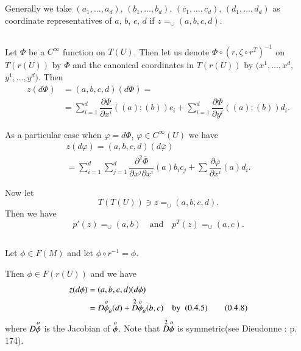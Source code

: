 \setcounter{subsection}{2}
\subsection{}\label{chap0:0.4.3}
Generally we take $(a_{1},\ldots,a_{d})$, $(b_{1},\ldots,b_{d})$,
$(c_{1},\ldots,c_{d})$, $(d_{1},\ldots,d_{d})$ as coordinate
representatives of $a$, $b$, $c$, $d$ if
$z\displaystyle{\mathop{=}_{\cup}}(a,b,c,d)$. 

\subsection{}\label{chap0:0.4.4}
Let $\Phi$ be a $C^{\infty}$ function on $T(U)$. Then let us denote
$\Phi\circ (r,\zeta\circ r^{T})^{-1}$ on $T(r(U))$ by
$\overline{\Phi}$ and the canonical coordinates in $T(r(U))$ by
$(x^{1},\ldots,x^{d}$, $y^{1},\ldots,y^{d})$. Then
\begin{align*}
z(d\Phi) &= (a,b,c,d)(d\Phi)=\tag{0.4.5}\label{chap0:0.4.5}\\
         &= \sum^{d}_{i=1}\dfrac{\partial\Phi}{\partial
  x^{i}}((a);(b))c_{i}+\sum^{d}_{i=1}\dfrac{\partial\Phi}{\partial
  y^{i}}((a);(b))d_{i}. 
\end{align*}

As a particular case when $\varphi=d\Phi$, $\varphi\in C^{\infty}(U)$
we have
\begin{gather*}
z(d\varphi)=(a,b,c,d)(d\overline{\varphi})\\
=\sum^{d}_{i=1}\sum^{d}_{j=1}\dfrac{\partial^{2}\overline{\Phi}}{\partial
  x^{j}\partial x^{i}}(a)b_{i}c_{j}+\sum \dfrac{\partial
  \overline{\varphi}}{\partial x^{i}}(a)d_{i}.
\end{gather*}

Now let
$$
T(T(U))\ni z\mathop{=}_{\cup}(a,b,c,d).
$$
Then we have
\begin{equation*}\label{chap0:0.4.6}
p'(z)\mathop{=}_{\cup}(a,b)\quad\text{and}\quad p^{T}(z)\mathop{=}_{\cup}(a,c).\tag{0.4.6}
\end{equation*}

\setcounter{subsection}{6}
\subsection{}\label{chap0:0.4.7}


\begin{example*}
Let $\phi\in F(M)$ and let $\phi\circ r^{-1}=\phi$.
\end{example*}
Then $\phi\in F(r(U))$ and we have
\begin{align*}
z(d\phi)& =(a,b,c,d)(d\phi)\\
&= D\ophi_{a}(d)+\overset{2}{D}\ophi_{a}(b,c)\quad\text{by \ (0.4.5)}\tag{0.4.8}\label{chap0:0.4.8} 
\end{align*}\pageoriginale
where $D\overset{o}{\phi}$ is the Jacobian of $\overset{o}{\phi}$. Note that
$\overset{2}{D}\overset{o}{\phi}$ is symmetric\break (see Dieudonne \cite{36} : p. 174).

